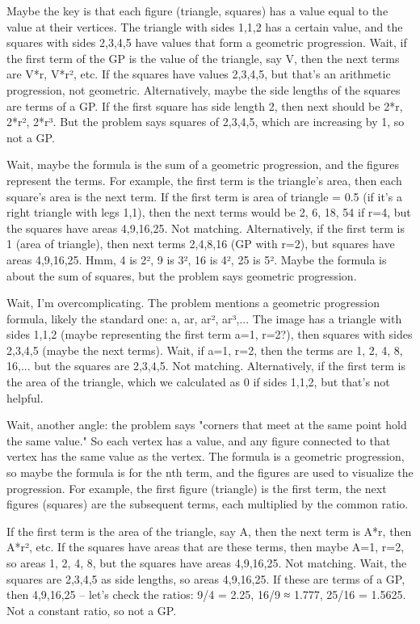 Maybe the key is that each figure (triangle, squares) has a value equal to the value at their vertices. The triangle with sides 1,1,2 has a certain value, and the squares with sides 2,3,4,5 have values that form a geometric progression. Wait, if the first term of the GP is the value of the triangle, say V, then the next terms are V*r, V*r², etc. If the squares have values 2,3,4,5, but that's an arithmetic progression, not geometric. Alternatively, maybe the side lengths of the squares are terms of a GP. If the first square has side length 2, then next should be 2*r, 2*r², 2*r³. But the problem says squares of 2,3,4,5, which are increasing by 1, so not a GP.

Wait, maybe the formula is the sum of a geometric progression, and the figures represent the terms. For example, the first term is the triangle's area, then each square's area is the next term. If the first term is area of triangle = 0.5 (if it's a right triangle with legs 1,1), then the next terms would be 2, 6, 18, 54 if r=4, but the squares have areas 4,9,16,25. Not matching. Alternatively, if the first term is 1 (area of triangle), then next terms 2,4,8,16 (GP with r=2), but squares have areas 4,9,16,25. Hmm, 4 is 2², 9 is 3², 16 is 4², 25 is 5². Maybe the formula is about the sum of squares, but the problem says geometric progression.

Wait, I'm overcomplicating. The problem mentions a geometric progression formula, likely the standard one: a, ar, ar², ar³,... The image has a triangle with sides 1,1,2 (maybe representing the first term a=1, r=2?), then squares with sides 2,3,4,5 (maybe the next terms). Wait, if a=1, r=2, then the terms are 1, 2, 4, 8, 16,... but the squares are 2,3,4,5. Not matching. Alternatively, if the first term is the area of the triangle, which we calculated as 0 if sides 1,1,2, but that's not helpful.

Wait, another angle: the problem says "corners that meet at the same point hold the same value." So each vertex has a value, and any figure connected to that vertex has the same value as the vertex. The formula is a geometric progression, so maybe the formula is for the nth term, and the figures are used to visualize the progression. For example, the first figure (triangle) is the first term, the next figures (squares) are the subsequent terms, each multiplied by the common ratio.

If the first term is the area of the triangle, say A, then the next term is A*r, then A*r², etc. If the squares have areas that are these terms, then maybe A=1, r=2, so areas 1, 2, 4, 8, but the squares have areas 4,9,16,25. Not matching. Wait, the squares are 2,3,4,5 as side lengths, so areas 4,9,16,25. If these are terms of a GP, then 4,9,16,25 – let's check the ratios: 9/4 = 2.25, 16/9 ≈ 1.777, 25/16 = 1.5625. Not a constant ratio, so not a GP.

